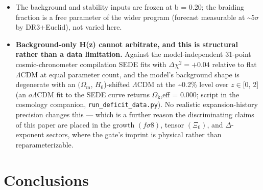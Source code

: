 \documentclass[preprint,12pt]{elsarticle}
\begin{document}
\begin{itemize}
  or an artifact of the Chebyshev inversion deserves a dedicated study.
  The sub-horizon growth signal \((\mu _\infty\), \(f\sigma 8\)) is set
  \emph{above} the window and is insensitive to this question; the ISW
  and the lensing-shaped −3.3, computed \emph{below} it, are conditional
  on it --- one further reason we take the \(f\sigma 8\) prediction, not
  the ISW or the \(-3.5\), as the primary falsifiable claim.
\item
  The background and stability inputs are frozen at b = 0.20; the
  braiding fraction is a free parameter of the wider program (forecast
  measurable at \textasciitilde{}\(5\sigma\) by DR3+Euclid), not varied
  here.
\item
  \textbf{Background-only H(z) cannot arbitrate, and this is structural
  rather than a data limitation.} Against the model-independent 31-point
  cosmic-chronometer compilation SEDE fits with
  \(\Delta \chi ^{2} = +0.04\) relative to flat \(\Lambda \mathrm{CDM}\)
  at equal parameter count, and the model's background shape is
  degenerate with an \((\Omega _{\mathrm{m}}\), \(H_{0}\))-shifted
  \(\Lambda \mathrm{CDM}\) at the \textasciitilde0.2\% level over
  \(z \in  [0\), 2{]} (an \(o\Lambda \mathrm{CDM}\) fit to the SEDE
  curve returns \(\Omega _{\mathrm{k}}\),eff = 0.000; script in the
  cosmology companion, \texttt{run\_\allowbreak deficit\_\allowbreak data.\allowbreak py}). No realistic
  expansion-history precision changes this --- which is a further reason
  the discriminating claims of this paper are placed in the growth
  \((f\sigma 8)\), tensor \((\Xi _{0})\), and \(\Delta\)-exponent
  sectors, where the gate's imprint is physical rather than
  reparameterizable.
\end{itemize}

\section{Conclusions}\label{sec-8}
\end{document}
